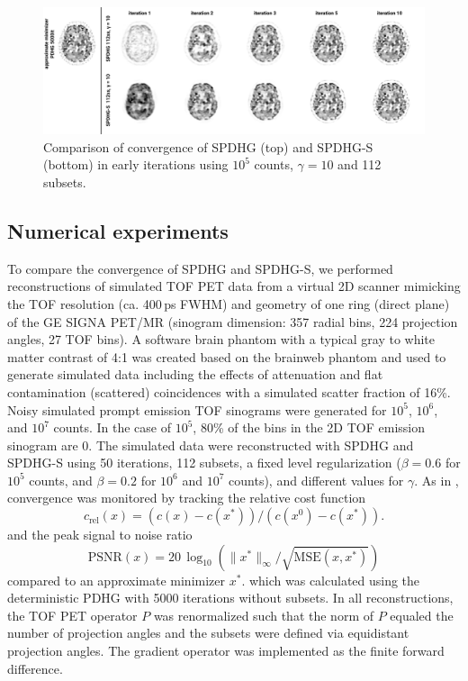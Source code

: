 \documentclass[11pt,twocolumn,twoside]{article}
\begin{document}
\begin{figure}
  \centering
  \includegraphics[width=1.0\textwidth]{./figs/fig3_early_iterations.png}
  \caption{Comparison of convergence of SPDHG (top) and SPDHG-S (bottom) in early iterations 
           using $10^5$ counts, $\gamma = 10$ and 112 subsets.}
  \label{fig:early}
\end{figure}



\subsection{Numerical experiments}

To compare the convergence of SPDHG and SPDHG-S, we performed reconstructions of simulated
TOF PET data from a virtual 2D scanner mimicking the TOF resolution (ca. 400\,ps FWHM) and 
geometry of one ring (direct plane) of the GE SIGNA PET/MR (sinogram dimension: 
357 radial bins, 224 projection angles, 27 TOF bins).
A software brain phantom with a typical gray to white matter contrast of 4:1 was created
based on the brainweb phantom and used to generate simulated data including the effects
of attenuation and flat contamination (scattered) coincidences
with a simulated scatter fraction of 16\%.
Noisy simulated prompt emission TOF sinograms were generated for $10^5$, $10^6$, 
and $10^7$ counts. 
In the case of $10^5$, 80\% of the bins in the 2D TOF emission sinogram are 0.
The simulated data were reconstructed with SPDHG and SPDHG-S using 50 iterations, 112 subsets,
a fixed level regularization ($\beta = 0.6$ for $10^5$ counts, and $\beta = 0.2$ for $10^6$
and $10^7$ counts), and different values for $\gamma$.
As in \cite{Ehrhardt2019}, convergence was monitored by tracking the relative cost function
\[ c_\text{rel}(x) = (c(x) - c(x^*)) / (c(x^0) - c(x^*)). \]
and the peak signal to noise ratio 
\[ \text{PSNR}(x) = 20\,\log_{10} \left( \|x^*\|_\infty/\sqrt{\text{MSE}(x,x^*)} \right) \]
compared to an approximate minimizer $x^*$.
which was calculated using the deterministic PDHG with 5000 iterations without subsets.
In all reconstructions, the TOF PET operator $P$ was renormalized such that the norm of $P$
equaled the number of projection angles and the
subsets were defined via equidistant projection angles.
The gradient operator was implemented as the finite forward difference.
\end{document}
